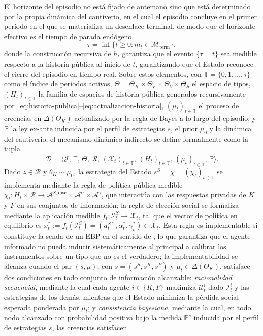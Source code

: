 \documentclass[review,authoryear,12pt]{elsarticle}
\theoremstyle{plain}
\theoremstyle{definition}
\newcommand{\Prob}{\mathbb{P}}
\newcommand{\ThetaK}{\Theta_K}
\newcommand{\1}{\mathbf{1}}
\begin{document}
El horizonte del episodio no está fijado de antemano sino que está determinado por la propia dinámica del cautiverio, en el cual el episodio concluye en el primer período en el que se materializa un desenlace terminal, de modo que el horizonte efectivo es el tiempo de parada endógeno.
\begin{equation}
\tau=\inf\{t\geq 0:m_t\in\mathcal{M}_{\mathrm{term}}\},\label{eq:stopping-time}
\end{equation}
donde la construcción recursiva de $h_t$ garantiza que el evento $\{\tau=t\}$ sea medible respecto a la historia pública al inicio de $t$, garantizando que el Estado reconoce el cierre del episodio en tiempo real. Sobre estos elementos, con $\mathbb{T}=\{0,1,\ldots,\tau\}$ como el índice de períodos activos, $\Theta=\ThetaK\times\Theta_F\times\Theta_V\times\Theta_S$ el espacio de tipos, $(H_t)_{t\in\mathbb{T}}$ la familia de espacios de historia pública generados recursivamente por~\eqref{eq:historia-publica}--\eqref{eq:actualizacion-historia}, $(\mu_t)_{t\in\mathbb{T}}$ el proceso de creencias en $\Delta(\ThetaK)$ actualizado por la regla de Bayes a lo largo del episodio, y $\Prob$ la ley ex-ante inducida por el perfil de estrategias $s$, el prior $\mu_0$ y la dinámica del cautiverio, el mecanismo dinámico indirecto se define formalmente como la tupla
\[
\mathcal{D}=\bigl\langle\mathcal{J},\,\mathbb{T},\,\Theta,\,\mathcal{R},\,(\mathcal{X}_t)_{t\in\mathbb{T}},\,(H_t)_{t\in\mathbb{T}},\,(\mu_t)_{t\in\mathbb{T}},\,\Prob\bigr\rangle.
\]
Dado $z\in\mathcal{R}$ y $\theta_K\sim\mu_0$, la estrategia del Estado $s^S=\chi=(\chi_t)_{t\in\mathbb{T}}$ se implementa mediante la regla de política pública medible $\chi_t\colon H_t\times\mathcal{R}\to\mathcal{A}^{S,\mathrm{disc}}\times\mathcal{A}^{\alpha}\times\mathcal{A}^{\gamma}$, que interactúa con las respuestas privadas de $K$ y $F$ en sus conjuntos de información; la regla de elección social se formaliza mediante la aplicación medible $f_t\colon\mathcal{I}_t^S\to\mathcal{X}_t$, tal que el vector de política en equilibrio es $x_t^\ast:=f_t(\mathcal{I}_t^S)=(a_t^{S\ast},\alpha_t^\ast,\gamma_t^\ast)\in\mathcal{X}_t$. Esta regla es implementable si constituye la senda de un EBP en el sentido de \citet{FudenbergTirole1991}, lo que garantiza que el agente informado no pueda inducir sistemáticamente al principal a calibrar los instrumentos sobre un tipo que no es el verdadero; la implementabilidad se alcanza cuando el par $(s,\mu)$, con $s=(s^S,s^K,s^F)$ y $\mu_t\in\Delta(\ThetaK)$, satisface dos condiciones en todo conjunto de información alcanzable: \emph{racionalidad secuencial}, mediante la cual cada agente $i\in\{K,F\}$ maximiza $\mathcal{U}_t^i$ dado $\mathcal{I}_t^i$ y las estrategias de los demás, mientras que el Estado minimiza la pérdida social esperada ponderada por $\mu_t$; y \emph{consistencia bayesiana}, mediante la cual, en todo nodo alcanzado con probabilidad positiva bajo la medida $\Prob^s$ inducida por el perfil de estrategias $s$, las creencias satisfacen
\end{document}
